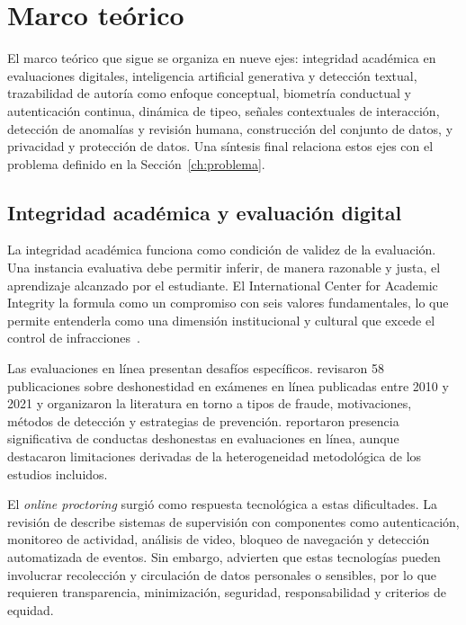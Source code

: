 \section{Marco teórico}
\label{ch:marco_teorico}

El marco teórico que sigue se organiza en nueve ejes: integridad académica en evaluaciones digitales, inteligencia artificial generativa y detección textual, trazabilidad de autoría como enfoque conceptual, biometría conductual y autenticación continua, dinámica de tipeo, señales contextuales de interacción, detección de anomalías y revisión humana, construcción del conjunto de datos, y privacidad y protección de datos. Una síntesis final relaciona estos ejes con el problema definido en la Sección~\ref{ch:problema}.

\subsection{Integridad académica y evaluación digital}
\label{sec:integridad_academica}

La integridad académica funciona como condición de validez de la evaluación. Una instancia evaluativa debe permitir inferir, de manera razonable y justa, el aprendizaje alcanzado por el estudiante. El International Center for Academic Integrity la formula como un compromiso con seis valores fundamentales, lo que permite entenderla como una dimensión institucional y cultural que excede el control de infracciones~\parencite{ICAI2021}.

Las evaluaciones en línea presentan desafíos específicos. \textcite{Noorbehbahani2022} revisaron 58 publicaciones sobre deshonestidad en exámenes en línea publicadas entre 2010 y 2021 y organizaron la literatura en torno a tipos de fraude, motivaciones, métodos de detección y estrategias de prevención. \textcite{Newton2024} reportaron presencia significativa de conductas deshonestas en evaluaciones en línea, aunque destacaron limitaciones derivadas de la heterogeneidad metodológica de los estudios incluidos.

El \textit{online proctoring} surgió como respuesta tecnológica a estas dificultades. La revisión de \textcite{Nigam2021} describe sistemas de supervisión con componentes como autenticación, monitoreo de actividad, análisis de video, bloqueo de navegación y detección automatizada de eventos. Sin embargo, \textcite{Mutimukwe2023} advierten que estas tecnologías pueden involucrar recolección y circulación de datos personales o sensibles, por lo que requieren transparencia, minimización, seguridad, responsabilidad y criterios de equidad.

